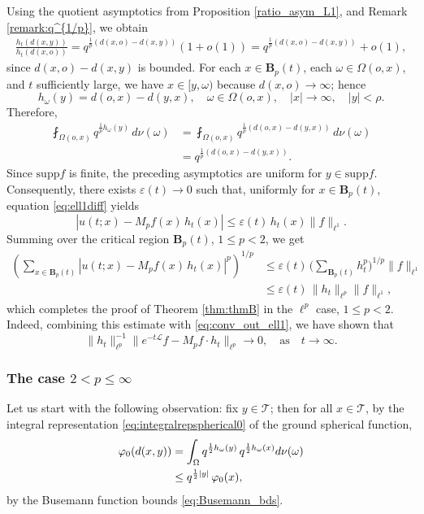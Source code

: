 \documentclass[11pt,a4paper,reqno]{amsart}
\renewcommand\mathcal{\mathscr}
\theoremstyle{plain}
\theoremstyle{remark}
\theoremstyle{definition}
\theoremstyle{remark}
\numberwithin{equation}{section}
\newcommand\supp{\mathrm{supp}}
\def\int{\intop\nolimits}
\begin{document}
    Using the quotient asymptotics from Proposition \ref{ratio_asym_L1}, and Remark \ref{remark:q^{1/p}}, we obtain
	\begin{align*}
		\frac{h_t(d(x,y))}{h_t(d(x,o))}=q^{\frac{1}{p}(d(x,o)-d(x,y))}(1+o(1))=q^{\frac{1}{p}(d(x,o)-d(x,y))}+o(1),
	\end{align*}
	since $d(x,o)-d(x,y)$ is bounded.  For each $x\in \textbf{B}_p(t)$, each $\omega \in \Omega(o, x)$, and $t$ sufficiently large,  we have
	$x \in [y, \omega)$ because $d(x,o)\to \infty$; hence
	\[
	h_{\omega}(y)=d(o,x)-d(y, x), \quad \omega \in \Omega(o,x), \quad |x|\to \infty, \quad |y|<\rho.
	\]
	Therefore,
	\begin{align*}
		\fint_{\Omega(o,x)} q^{\frac{1}{p}h_{\omega}(y)} \, d\nu(\omega)
		&=\fint_{\Omega(o,x)}q^{\frac{1}{p}(d(o, x)-d(y, x))} \, d\nu(\omega) \\
		&=q^{\frac{1}{p}(d(o, x)-d(y, x))}.
	\end{align*}
    Since $\supp f$ is finite, the preceding asymptotics are uniform for $y \in \supp f$.
Consequently, there exists $\varepsilon(t) \to 0$ such that, uniformly for $x\in \textbf{B}_p(t)$,  equation \eqref{eq:ell1diff} yields
	\[
	|u(t; x) - M_pf(x)\, h_t(x)|
	\leq 
	\varepsilon(t)\, h_t(x) \|f\|_{\ell^1}.
	\]
	 Summing over the critical region $\textbf{B}_p(t)$, $1\leq p<2$, we get
	\begin{align*}
	\left(	\sum_{x \in \textbf{B}_p(t)}
		\left|u(t; x) - M_pf(x)\, h_t(x)\right|^p \right)^{1/p}&\leq
		\varepsilon(t)\,\bigg(\sum_{ \textbf{B}_p(t)} h_t^p\bigg)^{1/p} \|f\|_{\ell^1}\\
		&\leq \varepsilon(t)\,
		\|h_t\|_{\ell^p} \|f\|_{\ell^1},
	\end{align*}
	which completes the proof of Theorem \ref{thm:thmB} in the $\ell^p$ case, $1\leq p<2$. Indeed, combining this estimate with \eqref{eq:conv_out_ell1}, we have shown that
	\[
		\|h_t\|_{\ell^p}^{-1}\|e^{-t\mathcal{L}}f 
	- M_pf\cdot h_t\|_{\ell^p}\to 0, \quad \text{as} \quad t \to \infty.
	\] 
	
	\subsubsection{The case $2<p\leq \infty$}
	Let us start with the following observation: fix $y\in \mathcal{T}$; then for all $x\in \mathcal{T}$, 
	by the integral representation  \eqref{eq:integralrepspherical0} of the ground spherical function,
	\begin{align}
		\varphi_{0}(d(x,y))
		&= 
		\int_\Omega q^{\frac{1}{2}h_{\omega}(y)}\,
		 q^{\frac{1}{2}h_{\omega}(x)}   d\nu( \omega) \notag\\
		&\leq q^{\frac{1}{2}|y|}\,\varphi_0(x),\label{eq:phi_quot_bdd}
	\end{align}
	by the Busemann function bounds \eqref{eq:Busemann_bds}.
	
\end{document}
